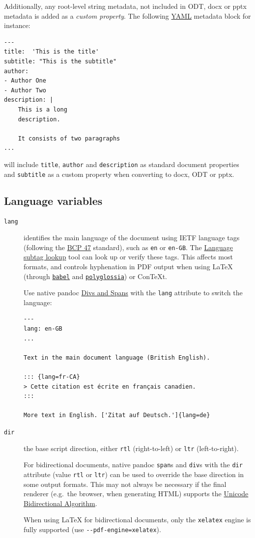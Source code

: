 \documentclass[
  b5paper
]{book}
\begin{document}
Additionally, any root-level string metadata, not included in ODT, docx
or pptx metadata is added as a \emph{custom property}. The following
\href{https://yaml.org/spec/1.2/spec.html}{YAML} metadata block for
instance:

\begin{verbatim}
---
title:  'This is the title'
subtitle: "This is the subtitle"
author:
- Author One
- Author Two
description: |
    This is a long
    description.

    It consists of two paragraphs
...
\end{verbatim}

will include \texttt{title}, \texttt{author} and \texttt{description} as
standard document properties and \texttt{subtitle} as a custom property
when converting to docx, ODT or pptx.

\subsection{Language variables}\label{language-variables}

\begin{description}
\item[\texttt{lang}]
identifies the main language of the document using IETF language tags
(following the \href{https://tools.ietf.org/html/bcp47}{BCP 47}
standard), such as \texttt{en} or \texttt{en-GB}. The
\href{https://r12a.github.io/app-subtags/}{Language subtag lookup} tool
can look up or verify these tags. This affects most formats, and
controls hyphenation in PDF output when using LaTeX (through
\href{https://ctan.org/pkg/babel}{\texttt{babel}} and
\href{https://ctan.org/pkg/polyglossia}{\texttt{polyglossia}}) or
ConTeXt.

Use native pandoc \hyperref[divs-and-spans]{Divs and Spans} with the
\texttt{lang} attribute to switch the language:

\begin{verbatim}
---
lang: en-GB
...

Text in the main document language (British English).

::: {lang=fr-CA}
> Cette citation est écrite en français canadien.
:::

More text in English. ['Zitat auf Deutsch.']{lang=de}
\end{verbatim}
\item[\texttt{dir}]
the base script direction, either \texttt{rtl} (right-to-left) or
\texttt{ltr} (left-to-right).

For bidirectional documents, native pandoc \texttt{span}s and
\texttt{div}s with the \texttt{dir} attribute (value \texttt{rtl} or
\texttt{ltr}) can be used to override the base direction in some output
formats. This may not always be necessary if the final renderer
(e.g.~the browser, when generating HTML) supports the
\href{https://www.w3.org/International/articles/inline-bidi-markup/uba-basics}{Unicode
Bidirectional Algorithm}.

When using LaTeX for bidirectional documents, only the \texttt{xelatex}
engine is fully supported (use \texttt{-\/-pdf-engine=xelatex}).
\end{description}
\end{document}
